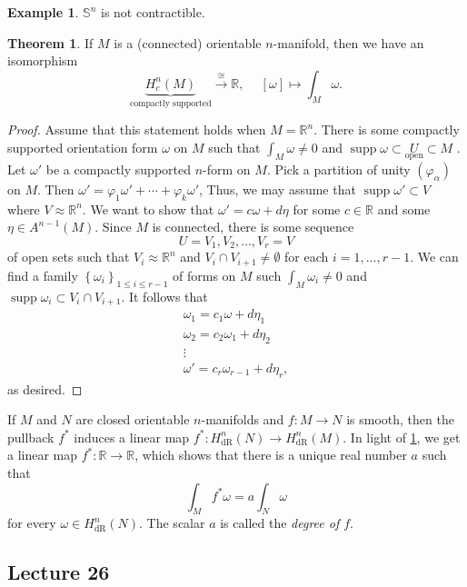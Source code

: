 \documentclass[10pt,letterpaper,cm]{nupset}
\theoremstyle{definition}
\newtheorem{exmp}[definition]{Example}
\theoremstyle{theorem}
\newtheorem{theorem}[definition]{Theorem}
\theoremstyle{remark}
\newcommand{\R}{\mathbb R}
\renewcommand{\S}{\mathbb S}
\newcommand{\1}{\mathbf{1}}
\newcommand{\0}{\vec 0}
\DeclareMathOperator{\supp}{supp}
\DeclareMathOperator{\dr}{dR}
\begin{document}
\begin{exmp}
$\S^n$ is not contractible.
\end{exmp}

\begin{theorem}\label{isom}
If $M$ is a (connected) orientable $n$-manifold, then we have an isomorphism $$\underbrace{H_c^n(M)}_{\text{compactly supported}} \overset{\cong}{\longrightarrow} \R,\ \quad [\omega] \mapsto \int_M \omega.$$
\end{theorem}
\begin{proof}
Assume that this statement holds when $M = \R^n$. There is some compactly supported orientation form $\omega$ on $M$ such that $\int_M \omega \ne 0$ and $\supp \omega \subset \underset{\text{open}}{U}\subset M$ . Let $\omega'$ be a compactly supported $n$-form on $M$. Pick a partition of unity $(\varphi_{\alpha})$ on $M$. Then $\omega' =\varphi_1\omega' +\cdots + \varphi_k \omega'$, Thus, we may assume  that $\supp \omega' \subset V$ where $V \approx \R^n$. We want to show that $\omega' =c\omega + d\eta$ for some $c\in \R$ and some $\eta \in A^{n-1}(M)$. Since $M$ is connected, there is some sequence $$U=V_1, V_2, \ldots, V_r=V$$ of open sets such that $V_i\approx \R^n$ and $V_i\cap V_{i+1} \ne \emptyset$ for each $i=1, \ldots, r-1$. We can find a family $\left\{\omega_i\right\}_{1\leq i \leq r-1}$ of forms on $M$ such $\int_M \omega_i \ne 0$ and $\supp \omega_i \subset V_i \cap V_{i+1}$.  It follows that 
\begin{gather*}
 \omega_1  = c_1\omega + d\eta_1
\\ \omega_2  = c_2\omega_1+ d\eta_2
\\  \vdots
\\  \omega'  =  c_r\omega_{r-1}+d\eta_r
, \end{gather*} as desired.
\end{proof}

If $M$ and $N$ are closed orientable $n$-manifolds and $f: M \to N$ is smooth, then the pullback $f^{\ast}$ induces a linear map $f^{\ast}: H_{\dr}^n(N) \to H_{\dr}^n(M)$. In light of \cref{isom}, we get a linear map $f^{\ast} : \R \to \R$, which shows that there is a unique  real number $a$ such that 
\[
\int_{M} f^{\ast} \omega = a\int_N \omega
\]
 for every $\omega \in H_{\dr}^n(N) $. The scalar $a$ is called the \textit{degree of $f$}. 

\subsection{Lecture 26}
\end{document}
